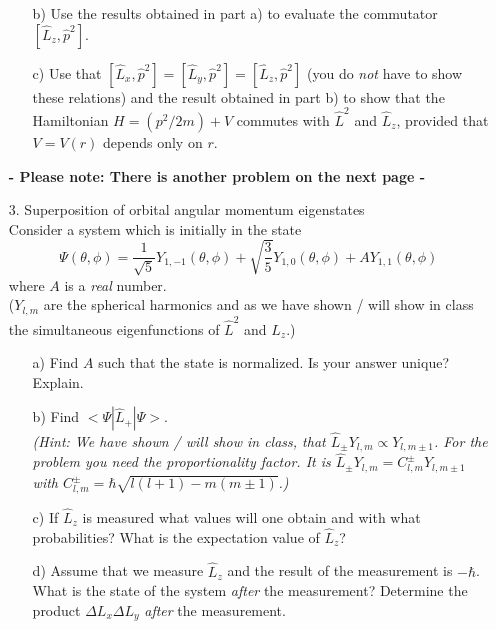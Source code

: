 \documentclass[11pt]{article}
\begin{document}
\begin{itemize}
\begin{itemize}
\begin{displaymath}
\end{displaymath}
\item[b)] Use the results obtained in part a) to evaluate the commutator $[{\hat L}_z,{\hat p}^2]$.
\item[c)] Use that $[{\hat L_x},{\hat p}^2] = [{\hat L_y},{\hat p}^2] = [{\hat L}_z,{\hat p}^2]$ (you do {\it not} have to show these relations) and the result obtained in part b) to show that the Hamiltonian $H = (p^2/2m) + V$ commutes with ${\hat L}^2$ and ${\hat L_z}$, provided that $V = V(r)$ depends only on $r$.
\end{itemize}
%
\vspace*{0.5cm}
\centerline{\bf - Please note: There is another problem on the next page -}
\newpage
%
\item[3.] Superposition of orbital angular momentum eigenstates\\
Consider a system which is initially in the state
\begin{displaymath}
\Psi(\theta,\phi) = \frac{1}{\sqrt{5}} Y_{1,-1}(\theta,\phi) + \sqrt{\frac{3}{5}} Y_{1,0}(\theta,\phi) + A Y_{1,1}(\theta,\phi)
\end{displaymath}
where $A$ is a {\it real} number.\\
($Y_{l,m}$ are the spherical harmonics and as we have shown / will show in class the simultaneous eigenfunctions of ${\hat L}^2$ and ${\hat L}_z$.)
\begin{itemize}
\item[a)] Find $A$ such that the state is normalized. Is your answer unique? Explain.
\item[b)] Find $<\Psi|{\hat L}_+|\Psi>$.\\ 
    {\it (Hint: We have shown / will show in class, that ${\hat L}_{\pm} Y_{l,m} \propto Y_{l,m\pm 1}$. For the problem you need the proportionality factor. It is ${\hat L}_{\pm} Y_{l,m} = C_{l,m}^{\pm} Y_{l,m\pm 1}$ with
    $C_{l,m}^{\pm} = \hbar \sqrt{l(l+1) - m(m\pm 1)}$.)}
\item[c)] If ${\hat L}_z$ is measured what values will one obtain and with what probabilities? What is the expectation value of ${\hat L}_z$?
\item[d)] Assume that we measure ${\hat L}_z$ and the result of the measurement is $-\hbar$. What is the state of the system {\it after} the measurement? Determine the product $\Delta L_x \Delta L_y$ {\it after} the measurement.
\end{itemize}
%
\end{itemize}
\end{document}

